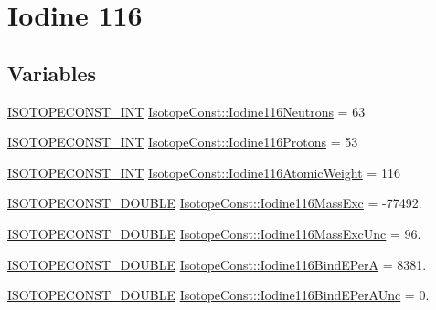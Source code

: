 \hypertarget{group___isotope_const-_iodine-_i116}{}\section{Iodine 116}
\label{group___isotope_const-_iodine-_i116}
\subsection*{Variables}
\begin{DoxyCompactItemize}
\item 
\mbox{\hyperlink{group___isotope_const-_macros_ga5f18360b3e99483a35c32d789e62621c}{I\+S\+O\+T\+O\+P\+E\+C\+O\+N\+S\+T\+\_\+\+I\+NT}} \mbox{\hyperlink{group___isotope_const-_iodine-_i116_ga747294018371df31e96a2fee73fae4df}{Isotope\+Const\+::\+Iodine116\+Neutrons}} = 63
\item 
\mbox{\hyperlink{group___isotope_const-_macros_ga5f18360b3e99483a35c32d789e62621c}{I\+S\+O\+T\+O\+P\+E\+C\+O\+N\+S\+T\+\_\+\+I\+NT}} \mbox{\hyperlink{group___isotope_const-_iodine-_i116_gab10ae8715e0673a31b1abcc40fbc7862}{Isotope\+Const\+::\+Iodine116\+Protons}} = 53
\item 
\mbox{\hyperlink{group___isotope_const-_macros_ga5f18360b3e99483a35c32d789e62621c}{I\+S\+O\+T\+O\+P\+E\+C\+O\+N\+S\+T\+\_\+\+I\+NT}} \mbox{\hyperlink{group___isotope_const-_iodine-_i116_ga55cb1f2898c4976ccf15c8cb66ff96bd}{Isotope\+Const\+::\+Iodine116\+Atomic\+Weight}} = 116
\item 
\mbox{\hyperlink{group___isotope_const-_macros_ga8f45a7272ce02c0b4c65c44636ed719a}{I\+S\+O\+T\+O\+P\+E\+C\+O\+N\+S\+T\+\_\+\+D\+O\+U\+B\+LE}} \mbox{\hyperlink{group___isotope_const-_iodine-_i116_ga9630c8aece91a9368e2cef5026c3b6a2}{Isotope\+Const\+::\+Iodine116\+Mass\+Exc}} = -\/77492.
\item 
\mbox{\hyperlink{group___isotope_const-_macros_ga8f45a7272ce02c0b4c65c44636ed719a}{I\+S\+O\+T\+O\+P\+E\+C\+O\+N\+S\+T\+\_\+\+D\+O\+U\+B\+LE}} \mbox{\hyperlink{group___isotope_const-_iodine-_i116_ga6809f39b9206efbf3dc78155f52bdd70}{Isotope\+Const\+::\+Iodine116\+Mass\+Exc\+Unc}} = 96.
\item 
\mbox{\hyperlink{group___isotope_const-_macros_ga8f45a7272ce02c0b4c65c44636ed719a}{I\+S\+O\+T\+O\+P\+E\+C\+O\+N\+S\+T\+\_\+\+D\+O\+U\+B\+LE}} \mbox{\hyperlink{group___isotope_const-_iodine-_i116_gaaeadc37f4f6808a8c9ff8e4e81fe8ca2}{Isotope\+Const\+::\+Iodine116\+Bind\+E\+PerA}} = 8381.
\item 
\mbox{\hyperlink{group___isotope_const-_macros_ga8f45a7272ce02c0b4c65c44636ed719a}{I\+S\+O\+T\+O\+P\+E\+C\+O\+N\+S\+T\+\_\+\+D\+O\+U\+B\+LE}} \mbox{\hyperlink{group___isotope_const-_iodine-_i116_ga22b1934d35d2fb12608e5ea97e9e5f47}{Isotope\+Const\+::\+Iodine116\+Bind\+E\+Per\+A\+Unc}} = 0.

\end{DoxyCompactItemize}
